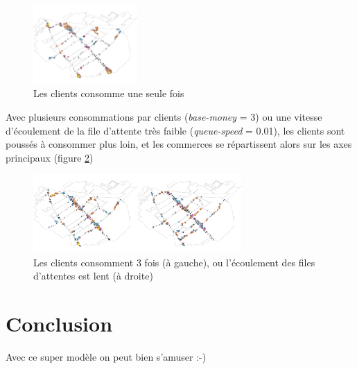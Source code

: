 \documentclass[11pt]{article}
\begin{document}
\begin{figure}[htbp]
\centering
\includegraphics[width=150px]{./images/t=12000_base-money=1_patience=10_queue-speed=0.5_maxdd=5.png}
\caption{\label{fig:org17d447f}
Les clients consomme une seule fois}
\end{figure}


Avec plusieurs consommations par clients (\emph{base-money} = 3) ou une
vitesse d'écoulement de la file d'attente très faible (\emph{queue-speed} = 0.01),
les clients sont poussés à consommer plus loin, et les commerces se 
répartissent alors sur les axes principaux (figure \ref{fig:orgfecf45f})

\begin{figure}[htbp]
\centering
\includegraphics[width=300px]{./images/grands_axes.png}
\caption{\label{fig:orgfecf45f}
Les clients consomment 3 fois (à gauche), ou l'écoulement des files d'attentes est lent (à droite)}
\end{figure}

\section{Conclusion}
\label{sec:orgc165a4c}

Avec ce super modèle on peut bien s'amuser :-)
\end{document}

